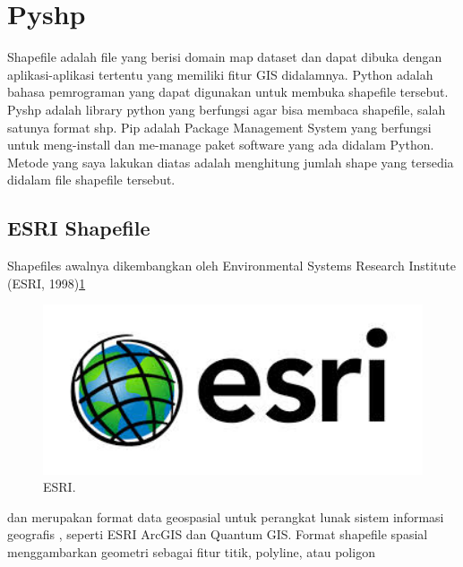 
\section{Pyshp}
Shapefile adalah file yang berisi domain map dataset dan dapat dibuka dengan aplikasi-aplikasi tertentu yang memiliki fitur GIS didalamnya.
Python adalah bahasa pemrograman yang dapat digunakan untuk membuka shapefile tersebut.
Pyshp adalah library python yang berfungsi agar bisa membaca shapefile, salah satunya format shp.
Pip adalah Package Management System yang berfungsi untuk meng-install dan me-manage paket software yang ada didalam Python.
Metode yang saya lakukan diatas adalah menghitung jumlah shape yang tersedia didalam file shapefile tersebut.

\subsection{ESRI Shapefile}
	
Shapefiles awalnya dikembangkan oleh Environmental Systems Research Institute (ESRI, 1998)\ref{esri}
	\begin{figure}[ht]
	\centerline{\includegraphics[width=1\textwidth]{figures/esri.JPG}}
	\caption{ESRI.}
	\label{esri}
	\end{figure}
	dan merupakan format data geospasial untuk perangkat lunak sistem informasi geografis , seperti ESRI ArcGIS dan Quantum GIS.
	Format shapefile spasial menggambarkan geometri sebagai fitur titik, polyline, atau poligon


